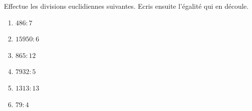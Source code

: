 %
%
  Effectue les divisions euclidiennes suivantes. Ecris ensuite l'égalité qui en découle.
  \begin{enumerate}[cols=3]
    \item $\num{486}:7$
    \item $\num{15950}:6$
    \item $\num{865}:12$
    \item $\num{7932}:5$
    \item $\num{1313}:13$
    \item $\num{79}:4$
  \end{enumerate}
